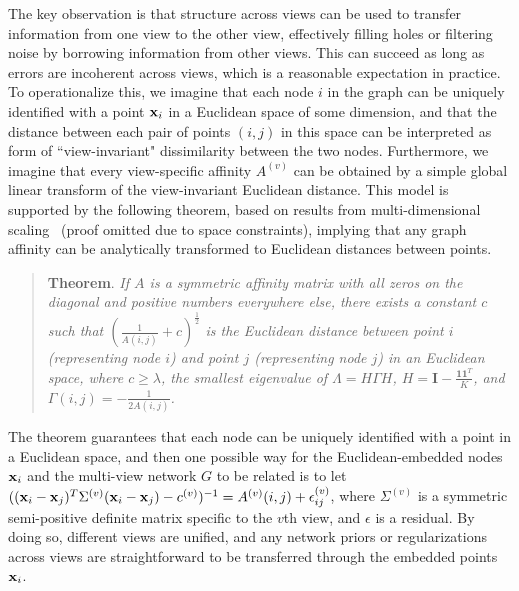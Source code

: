 
The key observation is that structure across views can be used to transfer information from one view to the other view, effectively filling holes or filtering noise by borrowing information from other views. This can succeed as long as errors are incoherent across views, which is a reasonable expectation in practice. To operationalize this, we imagine that each node $i$ in the graph can be uniquely identified with a point ${\bf x}_i$ in a Euclidean space of some dimension, and that the distance between each pair of points $(i,j)$ in this space can be interpreted as form of ``view-invariant" dissimilarity between the two nodes. Furthermore, we imagine that every view-specific affinity $A^{(v)}$ can be obtained by a simple global linear transform of the view-invariant Euclidean distance. This model is supported by the following theorem, based on results from multi-dimensional scaling~\cite{CoxMDS} (proof omitted due to space constraints), implying that any graph affinity can be analytically transformed to Euclidean distances between points.

\begin{quote}
\textbf{Theorem}. \textit{If $A$ is a symmetric affinity matrix with all zeros on the diagonal and positive numbers everywhere else, there exists a constant $c$ such that $(\frac{1}{A(i,j)}+c)^{\frac{1}{2}}$ is the Euclidean distance between point $i$ (representing node $i$) and point $j$ (representing node $j$) in an Euclidean space, where $c\geq\lambda$, the smallest eigenvalue of $\Lambda=H\Gamma H$, $H=\mathbf{I}-\frac{\mathbf{1}\mathbf{1}^T}{K}$, and $\Gamma(i,j)=-\frac{1}{2A(i,j)}$.} 
\end{quote}

The theorem guarantees that each node can be uniquely identified with a point in a Euclidean space, and then one possible way for the Euclidean-embedded nodes ${\bf x}_i$ and the multi-view network $G$ to be related is to let $(({\bf x}_i-{\bf x}_j)^{T}\Sigma^{(v)}({\bf x}_i-{\bf x}_j)-c^{(v)})^{-1}=A^{(v)}(i,j)+\epsilon^{(v)}_{ij}$, where $\Sigma^{(v)}$ is a symmetric semi-positive definite matrix specific to the $v$th view, and $\epsilon$ is a residual. By doing so, different views are unified, and any network priors or regularizations across views are straightforward to be transferred through the embedded points ${\bf x}_i$. 

